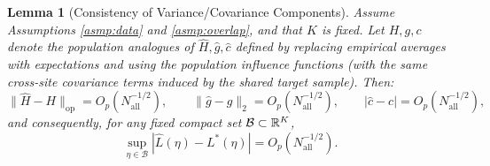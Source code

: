 \documentclass{article}
\newtheorem{lemma}[theorem]{Lemma}
\begin{document}
\begin{lemma}[Consistency of Variance/Covariance Components]\label{lem:var_components_agg}
Assume Assumptions \ref{asmp:data} and \ref{asmp:overlap}, and that $K$ is fixed. Let $H,g,c$ denote the population analogues of $\widehat{H},\widehat{g},\widehat{c}$ defined by replacing empirical averages with expectations and using the population influence functions (with the same cross-site covariance terms induced by the shared target sample). Then:
\[
\|\widehat{H}-H\|_{\mathrm{op}} = O_p(N_{\mathrm{all}}^{-1/2}),\qquad
\|\widehat{g}-g\|_2 = O_p(N_{\mathrm{all}}^{-1/2}),\qquad
|\widehat{c}-c| = O_p(N_{\mathrm{all}}^{-1/2}),
\]
and consequently, for any fixed compact set $\mathcal{B}\subset\mathbb{R}^K$,
\[
\sup_{\eta\in\mathcal{B}}|\widehat{L}(\eta)-L^*(\eta)| = O_p(N_{\mathrm{all}}^{-1/2}).
\]
\end{lemma}
\end{document}
